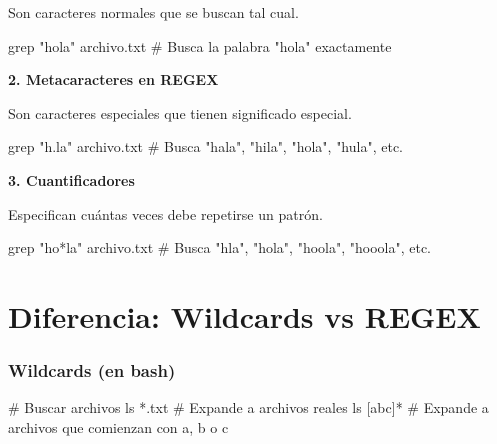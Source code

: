 \documentclass[
  spanish,
  12pt,
  letterpaper,
  DIV=11,
  numbers=noendperiod]{scrreprt}
\newenvironment{Shaded}{\begin{snugshade}}{\end{snugshade}}
\newcommand{\CommentTok}[1]{\textcolor[rgb]{0.37,0.37,0.37}{#1}}
\newcommand{\FunctionTok}[1]{\textcolor[rgb]{0.28,0.35,0.67}{#1}}
\newcommand{\NormalTok}[1]{\textcolor[rgb]{0.00,0.23,0.31}{#1}}
\newcommand{\PreprocessorTok}[1]{\textcolor[rgb]{0.68,0.00,0.00}{#1}}
\newcommand{\SpecialStringTok}[1]{\textcolor[rgb]{0.13,0.47,0.30}{#1}}
\newcommand{\StringTok}[1]{\textcolor[rgb]{0.13,0.47,0.30}{#1}}
\begin{document}
Son caracteres normales que se buscan tal cual.

\begin{Shaded}
\begin{Highlighting}[]
\FunctionTok{grep} \StringTok{"hola"}\NormalTok{ archivo.txt}
\CommentTok{\# Busca la palabra "hola" exactamente}
\end{Highlighting}
\end{Shaded}

\textbf{2. Metacaracteres en REGEX}

Son caracteres especiales que tienen significado especial.

\begin{Shaded}
\begin{Highlighting}[]
\FunctionTok{grep} \StringTok{"h.la"}\NormalTok{ archivo.txt}
\CommentTok{\# Busca "hala", "hila", "hola", "hula", etc.}
\end{Highlighting}
\end{Shaded}

\textbf{3. Cuantificadores}

Especifican cuántas veces debe repetirse un patrón.

\begin{Shaded}
\begin{Highlighting}[]
\FunctionTok{grep} \StringTok{"ho*la"}\NormalTok{ archivo.txt}
\CommentTok{\# Busca "hla", "hola", "hoola", "hooola", etc.}
\end{Highlighting}
\end{Shaded}

\section{Diferencia: Wildcards vs REGEX
🔄}\label{diferencia-wildcards-vs-regex}

\subsubsection{Wildcards (en bash)}\label{wildcards-en-bash}

\begin{Shaded}
\begin{Highlighting}[]
\CommentTok{\# Buscar archivos}
\FunctionTok{ls} \PreprocessorTok{*}\NormalTok{.txt           }\CommentTok{\# Expande a archivos reales}
\FunctionTok{ls} \PreprocessorTok{[}\SpecialStringTok{abc}\PreprocessorTok{]*}          \CommentTok{\# Expande a archivos que comienzan con a, b o c}
\end{Highlighting}
\end{Shaded}
\end{document}
